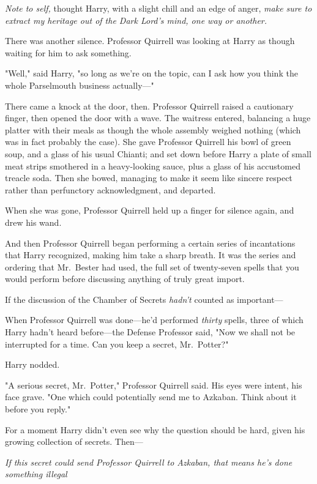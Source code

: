 \emph{Note to self,} thought Harry, with a slight chill and an edge of anger,
\emph{make sure to extract my heritage out of the Dark Lord's mind, one way or
another.}

There was another silence. Professor Quirrell was looking at Harry as though
waiting for him to ask something.

"Well," said Harry, "so long as we're on the topic, can I ask how you think the
whole Parselmouth business actually\mbox{---}"

There came a knock at the door, then. Professor Quirrell raised a cautionary
finger, then opened the door with a wave. The waitress entered, balancing a
huge platter with their meals as though the whole assembly weighed nothing
(which was in fact probably the case). She gave Professor Quirrell his bowl of
green soup, and a glass of his usual Chianti; and set down before Harry a plate
of small meat strips smothered in a heavy-looking sauce, plus a glass of his
accustomed treacle soda. Then she bowed, managing to make it seem like sincere
respect rather than perfunctory acknowledgment, and departed.

When she was gone, Professor Quirrell held up a finger for silence again, and
drew his wand.

And then Professor Quirrell began performing a certain series of incantations
that Harry recognized, making him take a sharp breath. It was the series and
ordering that Mr.~Bester had used, the full set of twenty-seven spells that you
would perform before discussing anything of truly great import.

If the discussion of the Chamber of Secrets \emph{hadn't} counted as
important---

When Professor Quirrell was done---he'd performed \emph{thirty} spells, three
of which Harry hadn't heard before---the Defense Professor said, "Now we shall
not be interrupted for a time. Can you keep a secret, Mr.~Potter?"

Harry nodded.

"A serious secret, Mr.~Potter," Professor Quirrell said. His eyes were intent,
his face grave. "One which could potentially send me to Azkaban. Think about it
before you reply."

For a moment Harry didn't even see why the question should be hard, given his
growing collection of secrets. Then---

\emph{If this secret could send Professor Quirrell to Azkaban, that means he's
done something illegal{\el}}

